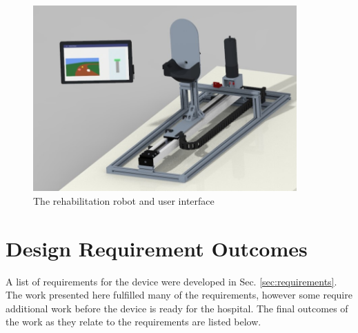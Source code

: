 \documentclass[12pt]{report}
\begin{document}
\begin{figure}[h]
	\centering
	\includegraphics[width=0.9\textwidth]{robot_cad}
	\caption{The rehabilitation robot and user interface}
	\label{fig:robot_cad}
\end{figure}		
		
	\section{Design Requirement Outcomes} \label{sec:outcomes}
	
A list of requirements for the device were developed in Sec. \ref{sec:requirements}. The work presented here fulfilled many of the requirements, however some require additional work before the device is ready for the hospital. The final outcomes of the work as they relate to the requirements are listed below. 
\end{document}
